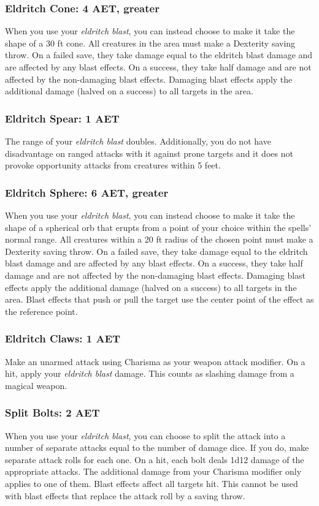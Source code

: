 \subsubsection{Eldritch Cone: 4 AET, greater}
When you use your \textit{eldritch blast}, you can instead choose to make it take the shape of a 30 ft cone. All creatures in the area must make a Dexterity saving throw. On a failed save, they take damage equal to the eldritch blast damage and are affected by any blast effects. On a success, they take half damage and are not affected by the non-damaging blast effects. Damaging blast effects apply the additional damage (halved on a success) to all targets in the area.

\subsubsection{Eldritch Spear: 1 AET}
The range of your \textit{eldritch blast} doubles. Additionally, you do not have disadvantage on ranged attacks with it against prone targets and it does not provoke opportunity attacks from creatures within 5 feet.

\subsubsection{Eldritch Sphere: 6 AET, greater}
When you use your \textit{eldritch blast}, you can instead choose to make it take the shape of a spherical orb that erupts from a point of your choice within the spells' normal range. All creatures within a 20 ft radius of the chosen point must make a Dexterity saving throw. On a failed save, they take damage equal to the eldritch blast damage and are affected by any blast effects. On a success, they take half damage and are not affected by the non-damaging blast effects. Damaging blast effects apply the additional damage (halved on a success) to all targets in the area. Blast effects that push or pull the target use the center point of the effect as the reference point.

\subsubsection{Eldritch Claws: 1 AET}
Make an unarmed attack using Charisma as your weapon attack modifier. On a hit, apply your \textit{eldritch blast} damage. This counts as slashing damage from a magical weapon.

\subsubsection{Split Bolts: 2 AET}
When you use your \textit{eldritch blast}, you can choose to split the attack into a number of separate attacks equal to the number of damage dice. If you do, make separate attack rolls for each one. On a hit, each bolt deals 1d12 damage of the appropriate attacks. The additional damage from your Charisma modifier only applies to one of them. Blast effects affect all targets hit. This cannot be used with blast effects that replace the attack roll by a saving throw.

